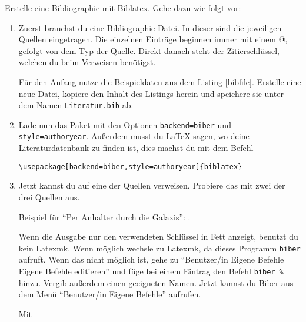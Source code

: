 \item Erstelle eine Bibliographie mit Biblatex. Gehe dazu wie folgt vor:
    \begin{enumerate}
        \item Zuerst brauchst du eine Bibliographie-Datei. In dieser sind die 
            jeweiligen Quellen eingetragen. Die einzelnen Einträge beginnen immer
            mit einem @, gefolgt von dem Typ der Quelle. Direkt danach steht der
            Zitierschlüssel, welchen du beim Verweisen benötigst.
        
            Für den Anfang nutze die Beispieldaten aus dem Listing \ref{bibfile}.
            Erstelle eine neue Datei, kopiere den Inhalt des Listings herein und
            speichere sie unter dem Namen \texttt{Literatur.bib} ab.
        
        \item Lade nun das Paket  mit den Optionen
            \texttt{backend=biber} und \texttt{style=authoryear}. Außerdem musst
            du \LaTeX{} sagen, wo deine Literaturdatenbank zu finden ist, dies
            machst du mit dem Befehl 
            \begin{loesung}
                \begin{verbatim}
\usepackage[backend=biber,style=authoryear]{biblatex}

                \end{verbatim}
            \end{loesung}
        
        \item Jetzt kannst du auf eine der Quellen verweisen. Probiere das mit
            zwei der drei Quellen aus.
            \begin{hinweis}
                Beispiel für \enquote{Per Anhalter durch die Galaxis}:
                \cite{Adam2004}.
            
                Wenn die Ausgabe nur den verwendeten Schlüssel in Fett anzeigt,
                benutzt du kein Latexmk. Wenn möglich wechsle zu Latexmk, da
                dieses Programm \texttt{biber} aufruft. Wenn das nicht möglich ist,
                gehe zu \enquote{Benutzer/in \textrightarrow{} Eigene Befehle
                \textrightarrow{} Eigene Befehle editieren} und füge bei einem
                Eintrag den Befehl \verb|biber %| hinzu. Vergib außerdem einen
                geeigneten Namen. Jetzt kannst du Biber aus dem Menü
                \enquote{Benutzer/in \textrightarrow{} Eigene Befehle} aufrufen.
            \end{hinweis}
            \begin{loesung}
                Mit 
            \end{loesung}
        

\end{enumerate}

